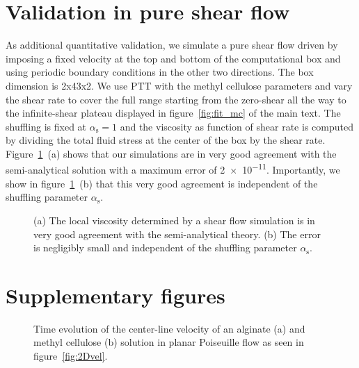 \documentclass[a4paper,12pt]{scrartcl}
\begin{document}

\section{Validation in pure shear flow}
\label{sec:shearFlow}

As additional quantitative validation, we simulate a pure shear flow driven by imposing a fixed velocity at the top and bottom of the computational box and using periodic boundary conditions in the other two directions.
The box dimension is 2x43x2.
We use PTT with the methyl cellulose parameters and vary the shear rate to cover the full range starting from the zero-shear all the way to the infinite-shear plateau displayed in figure~\ref{fig:fit_mc} of the main text.
The shuffling is fixed at $\alpha_\text{s} = 1$ and the viscosity as function of shear rate is computed by dividing the total fluid stress at the center of the box by the shear rate.
Figure~\ref{fig:wiParameterStudy}~(a) shows that our simulations are in very good agreement with the semi-analytical solution with a maximum error of \num{2e-11}.
Importantly, we show in figure~\ref{fig:wiParameterStudy}~(b) that this very good agreement is independent of the shuffling parameter $\alpha_\text{s}$.
	\begin{figure}[H]
		\centering
		\caption{(a) The local viscosity determined by a shear flow simulation is in very good agreement with the semi-analytical theory.
		(b) The error is negligibly small and independent of the shuffling parameter $\alpha_\text{s}$.}
		\label{fig:wiParameterStudy}
	\end{figure}







\section{Supplementary figures}
\label{sec:supplementaryFigures}

	\begin{figure}[H]
		\centering
		\caption{Time evolution of the center-line velocity of an alginate (a) and methyl cellulose (b) solution in planar Poiseuille flow as seen in figure~\ref{fig:2Dvel}.}
		\label{fig:2DTimeEvolution}
	\end{figure}
\end{document}
